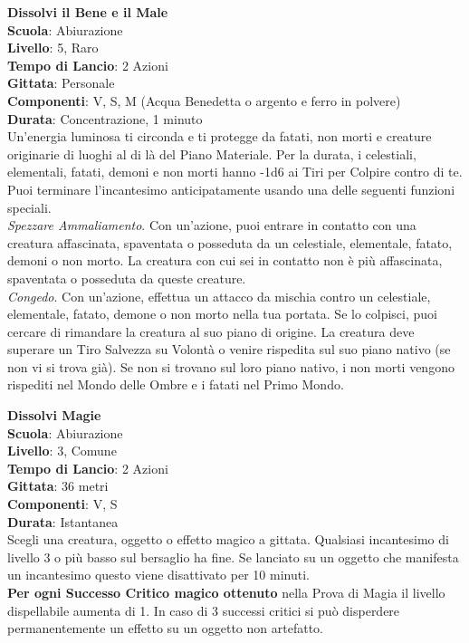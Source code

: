 \begin{multicols}{2}
\medskip\textbf{Dissolvi il Bene e il Male}\\
\textbf{Scuola}: Abiurazione\\
\textbf{Livello}: 5, Raro\\
\textbf{Tempo di Lancio}: 2 Azioni\\
\textbf{Gittata}: Personale\\
\textbf{Componenti}: V, S, M (Acqua Benedetta o argento e ferro in polvere)\\
\textbf{Durata}: Concentrazione, 1 minuto \\
Un'energia luminosa ti circonda e ti protegge da fatati, non morti e creature originarie di luoghi al di là del Piano Materiale. Per la durata, i celestiali, elementali, fatati, demoni e non morti hanno -1d6 ai Tiri per Colpire contro di te. Puoi terminare l'incantesimo anticipatamente usando una delle seguenti funzioni speciali.\\
\textit{Spezzare Ammaliamento}. Con un'azione, puoi entrare in contatto con una creatura affascinata, spaventata o posseduta da un celestiale, elementale, fatato, demoni o non morto. La creatura con cui sei in contatto non è più affascinata, spaventata o posseduta da queste creature.\\
\textit{Congedo}. Con un'azione, effettua un attacco da mischia contro un celestiale, elementale, fatato, demone o non morto nella tua portata. Se lo colpisci, puoi cercare di rimandare la creatura al suo piano di origine. La creatura deve superare un Tiro Salvezza su Volontà o venire rispedita sul suo piano nativo (se non vi si trova già). Se non si trovano sul loro piano nativo, i non morti vengono rispediti nel Mondo delle Ombre e i fatati nel Primo Mondo.

\medskip\textbf{Dissolvi Magie}\hypertarget{dissolvimagie}{}\\
\textbf{Scuola}: Abiurazione\\
\textbf{Livello}: 3, Comune\\
\textbf{Tempo di Lancio}: 2 Azioni\\
\textbf{Gittata}: 36 metri\\
\textbf{Componenti}: V, S\\
\textbf{Durata}: Istantanea\\
Scegli una creatura, oggetto o effetto magico a gittata. Qualsiasi incantesimo di livello 3 o più basso sul bersaglio ha fine. Se lanciato su un oggetto che manifesta un incantesimo questo viene disattivato per 10 minuti.\\
\textbf{Per ogni Successo Critico magico ottenuto} nella Prova di Magia il livello dispellabile aumenta di 1. In caso di 3 successi critici si può disperdere permanentemente un effetto su un oggetto non artefatto.



\end{multicols}
